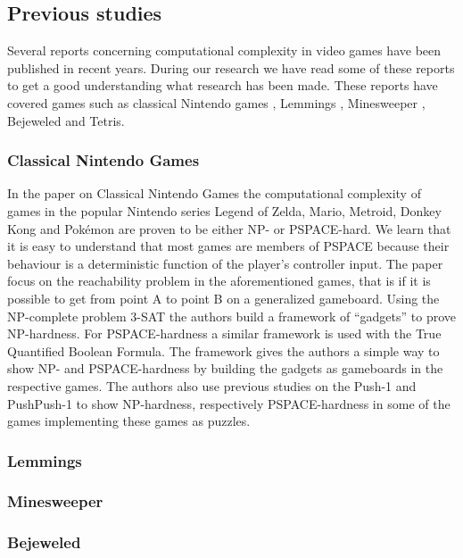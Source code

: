 \subsection{Previous studies}

Several reports concerning computational complexity in video games have been published in recent years. During our research we have read some of these reports to get a good understanding what research has been made. These reports have covered games such as classical Nintendo games \cite{classic}, Lemmings \cite{lemmings}, Minesweeper \cite{minesweeper}, Bejeweled \cite{candy} and Tetris. \cite{tetris}

\subsubsection{Classical Nintendo Games}

In the paper on Classical Nintendo Games the computational complexity of games in the popular Nintendo series Legend of Zelda, Mario, Metroid, Donkey Kong and Pokémon are proven to be either NP- or PSPACE-hard. We learn that it is easy to understand that most games are members of PSPACE because their behaviour is a deterministic function of the player's controller input. The paper focus on the reachability problem in the aforementioned games, that is if it is possible to get from point A to point B on a generalized gameboard. Using the NP-complete problem 3-SAT the authors build a framework of ``gadgets'' to prove NP-hardness. For PSPACE-hardness a similar framework is used with the True Quantified Boolean Formula. The framework gives the authors a simple way to show NP- and PSPACE-hardness by building the gadgets as gameboards in the respective games. The authors also use previous studies on the Push-1 \cite{push1} and PushPush-1 \cite{pushpushk} to show NP-hardness, respectively PSPACE-hardness in some of the games implementing these games as puzzles. 

\subsubsection{Lemmings}

\subsubsection{Minesweeper}

\subsubsection{Bejeweled}

